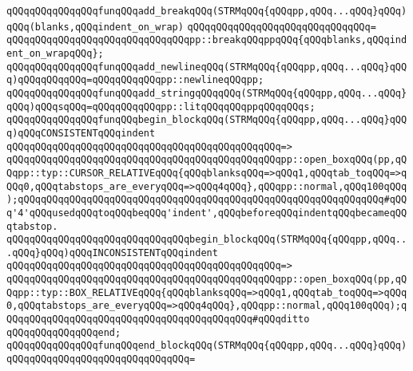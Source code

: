 \newline
\newline
\verb|qQQqqQQqqQQqqQQqfunqQQqadd_breakqQQq(STRMqQQq{qQQqpp,qQQq...qQQq}qQQq)qQQq(blanks,qQQqindent_on_wrap)|\newline
\verb|qQQqqQQqqQQqqQQqqQQqqQQqqQQqqQQq=|\newline
\verb|qQQqqQQqqQQqqQQqqQQqqQQqqQQqqQQqpp::breakqQQqppqQQq{qQQqblanks,qQQqindent_on_wrapqQQq};|\newline
\newline
\verb|qQQqqQQqqQQqqQQqfunqQQqadd_newlineqQQq(STRMqQQq{qQQqpp,qQQq...qQQq}qQQq)qQQqqQQqqQQq=qQQqqQQqqQQqpp::newlineqQQqpp;|\newline
\verb|qQQqqQQqqQQqqQQqfunqQQqadd_stringqQQqqQQq(STRMqQQq{qQQqpp,qQQq...qQQq}qQQq)qQQqsqQQq=qQQqqQQqqQQqpp::litqQQqqQQqppqQQqqQQqs;|\newline
\newline
\newline
\verb|qQQqqQQqqQQqqQQqfunqQQqbegin_blockqQQq(STRMqQQq{qQQqpp,qQQq...qQQq}qQQq)qQQqCONSISTENTqQQqindent|\newline
\verb|qQQqqQQqqQQqqQQqqQQqqQQqqQQqqQQqqQQqqQQqqQQqqQQq=>|\newline
\verb|qQQqqQQqqQQqqQQqqQQqqQQqqQQqqQQqqQQqqQQqqQQqqQQqpp::open_boxqQQq(pp,qQQqpp::typ::CURSOR_RELATIVEqQQq{qQQqblanksqQQq=>qQQq1,qQQqtab_toqQQq=>qQQq0,qQQqtabstops_are_everyqQQq=>qQQq4qQQq},qQQqpp::normal,qQQq100qQQq);qQQqqQQqqQQqqQQqqQQqqQQqqQQqqQQqqQQqqQQqqQQqqQQqqQQqqQQqqQQqqQQq#qQQq'4'qQQqusedqQQqtoqQQqbeqQQq'indent',qQQqbeforeqQQqindentqQQqbecameqQQqtabstop.|\newline
\newline
\verb|qQQqqQQqqQQqqQQqqQQqqQQqqQQqqQQqbegin_blockqQQq(STRMqQQq{qQQqpp,qQQq...qQQq}qQQq)qQQqINCONSISTENTqQQqindent|\newline
\verb|qQQqqQQqqQQqqQQqqQQqqQQqqQQqqQQqqQQqqQQqqQQqqQQq=>|\newline
\verb|qQQqqQQqqQQqqQQqqQQqqQQqqQQqqQQqqQQqqQQqqQQqqQQqpp::open_boxqQQq(pp,qQQqpp::typ::BOX_RELATIVEqQQq{qQQqblanksqQQq=>qQQq1,qQQqtab_toqQQq=>qQQq0,qQQqtabstops_are_everyqQQq=>qQQq4qQQq},qQQqpp::normal,qQQq100qQQq);qQQqqQQqqQQqqQQqqQQqqQQqqQQqqQQqqQQqqQQqqQQq#qQQqditto|\newline
\verb|qQQqqQQqqQQqqQQqend;|\newline
\newline
\newline
\verb|qQQqqQQqqQQqqQQqfunqQQqend_blockqQQq(STRMqQQq{qQQqpp,qQQq...qQQq}qQQq)|\newline
\verb|qQQqqQQqqQQqqQQqqQQqqQQqqQQqqQQq=|\newline
